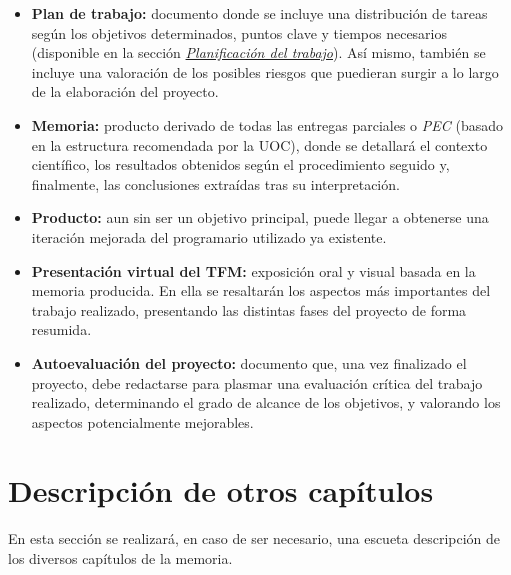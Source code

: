 \documentclass[IB,BIB]{TFUOC}%
\begin{document}
\footnotesize

\begin{itemize}
    \item \textbf{Plan de trabajo:} documento donde se incluye una distribución de tareas según los objetivos determinados, puntos clave y tiempos necesarios (disponible en la sección \textit{\hyperref[sec:Planificación del trabajo]{Planificación del trabajo}}). Así mismo, también se incluye una valoración de los posibles riesgos que puedieran surgir a lo largo de la elaboración del proyecto.
    \item \textbf{Memoria:} producto derivado de todas las entregas parciales o \textit{PEC} (basado en la estructura recomendada por la UOC), donde se detallará el contexto científico, los resultados obtenidos según el procedimiento seguido y, finalmente, las conclusiones extraídas tras su interpretación.
    \item \textbf{Producto:} aun sin ser un objetivo principal, puede llegar a obtenerse una iteración mejorada del programario utilizado ya existente.
    \item \textbf{Presentación virtual del TFM:} exposición oral y visual basada en la memoria producida. En ella se resaltarán los aspectos más importantes del trabajo realizado, presentando las distintas fases del proyecto de forma resumida.
    \item \textbf{Autoevaluación del proyecto:} documento que, una vez finalizado el proyecto, debe redactarse para plasmar una evaluación crítica del trabajo realizado, determinando el grado de alcance de los objetivos, y valorando los aspectos potencialmente mejorables.
\end{itemize}

\normalsize


\section{Descripción de otros capítulos}
\label{sec:Descripción de otros capítulos}

En esta sección se realizará, en caso de ser necesario, una escueta descripción de los diversos capítulos de la memoria.



\end{document}
